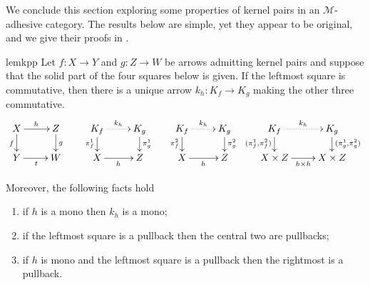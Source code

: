 \documentclass[3p]{elsarticle}
\def\D{\textbf {\textup{D}}}
\def\X{\textbf {\textup{X}}}
\newcommand{\commentato}[1]{ {} }
\theoremstyle{remark}
\theoremstyle{definition}
\begin{document}
\commentato{ 
\begin{restatable}{cor}{natepi}\label{cor:reg_epi_components_reg_epi_nat_trans}
    Let $\X$ be a category with pullbacks and $\phi\colon F \to G$ a natural transformation between functors $F, G: \D \rightrightarrows \X$. If $\phi_d$ is a regular epi for every $d$, then $\phi$ is a regular epi.
\end{restatable}

From the previous result we deduce that the class of regular epis is closed under colimits.

\begin{restatable}{lem}{epicol}\label{lemma:nat_trans_reg_epi_canonical_arrow_reg_epi}
    Let $F,G\colon \D\rightrightarrows \X$ be two diagrams, and suppose that $\X$ has all colimits of shape $\D$. Let $(X, \{x_d\}_{d \in \D})$ and $(Y, \{y_d\}_{d\in D})$ be the colimits of $F$ and $G$, respectively.  If $\phi\colon  F \to G$ is a natural transformation whose components are regular epis, then the arrow induced by $\phi$ from $X$ to $Y$ is a regular epi.
\end{restatable}
}
We conclude this section exploring some properties of kernel pairs in an $\mathcal{M}$-adhesive category. 
The results below are simple, yet they appear to be original, and we give their proofs in .

\begin{restatable}{lem}{kpp}\label{lemma:kern_pairs_pres_pullbacks}
	Let $f\colon X \to Y$ and $g\colon Z \to W$ be arrows admitting kernel pairs and suppose that the solid part of the four squares below is given. 
	If the leftmost square is commutative, then there is a unique arrow $k_h\colon K_f \to K_g$ making the other three commutative.
	\[\xymatrix@R=15pt{X \ar[r]^{h}\ar[d]_{f}& Z \ar[d]^{g} & K_f \ar@{.>}[r]^{k_h} \ar[d]_{\pi^1_f}& K_g \ar[d]^{\pi^1_g} & K_f  \ar@{.>}[r]^{k_h} \ar[d]_{\pi^2_f}& K_g \ar[d]^{\pi^2_g}& K_f  \ar@{.>}[r]^{k_h} \ar[d]_{(\pi^1_f,\pi^2_f)} & K_g \ar[d]^{(\pi^1_g, \pi^2_g)}\\ Y \ar[r]_t& W & X \ar[r]_{h} & Z & X\ar[r]_{h} &Z & X\times Z \ar[r]_{h\times h}& X\times Z}\]
	
		Moreover, the following facts hold
		\begin{enumerate}
			\item if $h$ is a mono then $k_h$ is a mono;
			\item if the leftmost square is a pullback then the central two are pullbacks;
			\item if $h$ is mono and the leftmost square is a pullback then the rightmost is a pullback.
		\end{enumerate} 
\end{restatable}
\end{document}
